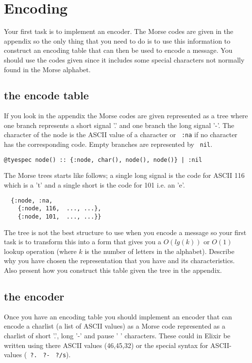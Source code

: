 \documentclass[a4paper,11pt]{article}
\begin{document}
\section*{Encoding}

Your first task is to implement an encoder. The Morse codes are given
in the appendix so the only thing that you need to do is to use this
information to construct an encoding table that can then be used to
encode a message. You should use the codes given since it includes some
special characters not normally found in the Morse alphabet.

\subsection*{the encode table}

If you look in the appendix the Morse codes are given represented as a
tree where one branch represents a short signal '.' and one branch the
long signal '-'.  The character of the node is the ASCII value of a
character or \verb+ :na+ if no character has the corresponding
code. Empty branches are represented by \verb+ nil+.

\begin{verbatim}
@tyespec node() :: {:node, char(), node(), node()} | :nil
\end{verbatim}

The Morse trees starts like follows; a single long signal is the code
for ASCII 116 which is a 't' and a single short is the code for 101
i.e. an 'e'.

\begin{verbatim}
  {:node, :na,
    {:node, 116,  ..., ...},
    {:node, 101,  ..., ...}}
\end{verbatim}

The tree is not the best structure to use when you encode a message so
your first task is to transform this into a form that gives you a
$O(lg(k))$ or $O(1)$ lookup operation (where $k$ is the number of
letters in the alphabet). Describe why you have chosen the
representation that you have and its characteristics. Also present how
you construct this table given the tree in the appendix.

\subsection*{the encoder}

Once you have an encoding table you should implement an encoder that
can encode a charlist (a list of ASCII values) as a Morse code
represented as a charlist of short '.', long '-' and pause ' '
characters. These could in Elixir be written using there ASCII values
(46,45,32) or the special syntax for ASCII-values (\verb+ ?.+
\verb+ ?-+ \verb+ ?/s+). 
\end{document}
